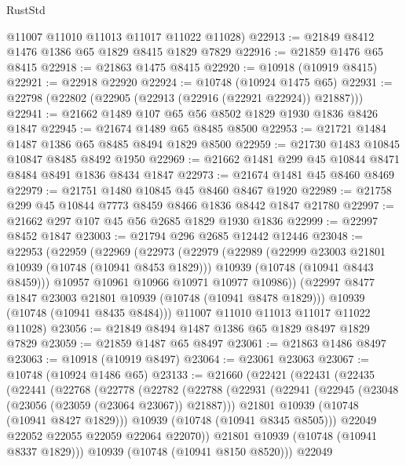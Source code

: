 \begin{lexlean}{RustStd}
\begin{coremodule}
      @11007
      @11010
      @11013
      @11017
      @11022
      @11028)
@22913 := @21849 @8412 @1476 @1386 @65 @1829 @8415 @1829 @7829
@22916 := @21859 @1476 @65 @8415
@22918 := @21863 @1475 @8415
@22920 := @10918 (@10919 @8415)
@22921 := @22918 @22920
@22924 := @10748 (@10924 @1475 @65)
@22931 := @22798 (@22802 (@22905 (@22913 (@22916 (@22921 @22924)) @21887)))
@22941 := @21662 @1489 @107 @65 @56 @8502 @1829 @1930 @1836 @8426 @1847
@22945 := @21674 @1489 @65 @8485 @8500
@22953 := @21721 @1484 @1487 @1386 @65 @8485 @8494 @1829 @8500
@22959 := @21730 @1483 @10845 @10847 @8485 @8492 @1950
@22969 := @21662 @1481 @299 @45 @10844 @8471 @8484 @8491 @1836 @8434 @1847
@22973 := @21674 @1481 @45 @8460 @8469
@22979 := @21751 @1480 @10845 @45 @8460 @8467 @1920
@22989 := @21758 @299 @45 @10844 @7773 @8459 @8466 @1836 @8442 @1847 @21780
@22997 := @21662 @297 @107 @45 @56 @2685 @1829 @1930 @1836
@22999 := @22997 @8452 @1847
@23003 := @21794 @296 @2685 @12442 @12446
@23048 := @22953
    (@22959
      (@22969
        (@22973
          (@22979
            (@22989
              (@22999 @23003 @21801 @10939 (@10748 (@10941 @8453 @1829)))
              @10939
              (@10748 (@10941 @8443 @8459)))
            @10957
            @10961
            @10966
            @10971
            @10977
            @10986))
        (@22997 @8477 @1847 @23003 @21801 @10939 (@10748 (@10941 @8478 @1829)))
        @10939
        (@10748 (@10941 @8435 @8484)))
      @11007
      @11010
      @11013
      @11017
      @11022
      @11028)
@23056 := @21849 @8494 @1487 @1386 @65 @1829 @8497 @1829 @7829
@23059 := @21859 @1487 @65 @8497
@23061 := @21863 @1486 @8497
@23063 := @10918 (@10919 @8497)
@23064 := @23061 @23063
@23067 := @10748 (@10924 @1486 @65)
@23133 := @21660
    (@22421
      (@22431
        (@22435
          (@22441
            (@22768
              (@22778
                (@22782
                  (@22788
                    (@22931
                      (@22941
                        (@22945 (@23048 (@23056 (@23059 (@23064 @23067)) @21887)))
                        @21801
                        @10939
                        (@10748 (@10941 @8427 @1829)))
                      @10939
                      (@10748 (@10941 @8345 @8505)))
                    @22049
                    @22052
                    @22055
                    @22059
                    @22064
                    @22070))
                @21801
                @10939
                (@10748 (@10941 @8337 @1829)))
              @10939
              (@10748 (@10941 @8150 @8520)))
            @22049

\end{coremodule}
\end{lexlean}
